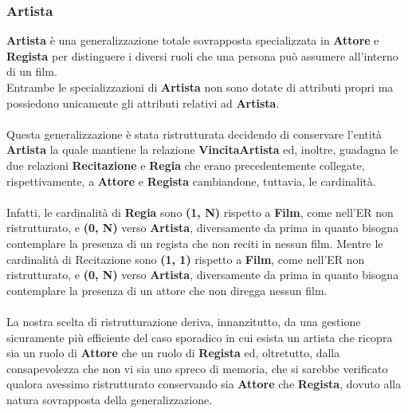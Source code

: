 \documentclass{article}
\begin{document}
\subsubsection{Artista}
\textbf{Artista} è una generalizzazione totale sovrapposta specializzata in \textbf{Attore} e \textbf{Regista} per distinguere i diversi ruoli che una persona può assumere all'interno di un film. 
\\ 
Entrambe le specializzazioni di \textbf{Artista} non sono dotate di attributi propri ma possiedono unicamente gli attributi relativi ad \textbf{Artista}. 
\\ 
\\
Questa generalizzazione è stata ristrutturata decidendo di conservare l'entità \textbf{Artista} la quale mantiene la relazione \textbf{VincitaArtista} ed, inoltre, guadagna le due relazioni \textbf{Recitazione} e \textbf{Regia} che erano precedentemente collegate, rispettivamente, a \textbf{Attore} e \textbf{Regista} cambiandone, tuttavia, le cardinalità. 
\\ 
\\
%
%
%
%
%
%
%
%
Infatti, le cardinalità di \textbf{Regia} sono \textbf{(1, N)} rispetto a \textbf{Film}, come nell'ER non ristrutturato, e \textbf{(0, N)} verso \textbf{Artista}, diversamente da prima in quanto bisogna contemplare la presenza di un regista che non reciti in nessun film. Mentre le cardinalità di Recitazione sono \textbf{(1, 1)} rispetto a \textbf{Film}, come nell'ER non ristrutturato, e \textbf{(0, N)} verso \textbf{Artista}, diversamente da prima in quanto bisogna contemplare la presenza di un attore che non diregga nessun film. 
\\ 
\\ 
La nostra scelta di ristrutturazione deriva, innanzitutto, da una gestione sicuramente più efficiente del caso sporadico in cui esista un artista che ricopra sia un ruolo di \textbf{Attore} che un ruolo di \textbf{Regista} ed, oltretutto, dalla consapevolezza che non vi sia uno spreco di memoria, che si sarebbe verificato qualora avessimo ristrutturato conservando sia \textbf{Attore} che \textbf{Regista}, dovuto alla natura sovrapposta della generalizzazione. 
\\ 
\\
\end{document}
